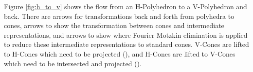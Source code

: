 Figure \ref{fig:h_to_v} shows the flow from an H-Polyhedron to a V-Polyhedron and back.  There are \textcolor{\ptovcolor}{{\ptovcolor} arrows} for transformations back and forth from polyhedra to cones, \textcolor{\liftcolor}{{\liftcolor} arrows} to show the transformation between cones and intermediate representations, and \textcolor{\dropcolor}{{\dropcolor} arrows} to show where Fourier Motzkin elimination is applied to reduce these intermediate representations to standard cones.  V-Cones are \textcolor{\liftcolor}{lifted} to H-Cones which need to be \textcolor{\dropcolor}{projected (\HDropdesc)}, and H-Cones are \textcolor{\liftcolor}{lifted} to V-Cones which need to be \textcolor{\dropcolor}{intersected and projected (\VDropdesc)}.
